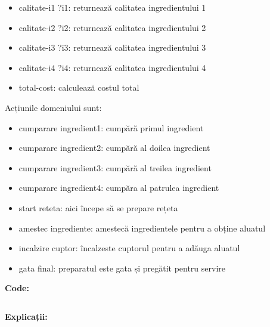  \begin{itemize}
    \setlength\itemsep{0em}
    \item calitate-i1 ?i1: returnează calitatea ingredientului 1
    \item calitate-i2 ?i2: returnează calitatea ingredientului 2
    \item calitate-i3 ?i3: returnează calitatea ingredientului 3
    \item calitate-i4 ?i4: returnează calitatea ingredientului 4
    \item total-cost: calculează costul total


\end{itemize}
Acțiunile domeniului sunt:

 \begin{itemize}
    \setlength\itemsep{0em}
    \item cumparare ingredient1: cumpără primul ingredient
    \item cumparare ingredient2: cumpără al doilea ingredient
    \item cumparare ingredient3: cumpără al treilea ingredient
    \item cumparare ingredient4: cumpăra al patrulea ingredient
    \item start reteta: aici începe să se prepare rețeta
    \item amestec ingrediente:  amestecă ingredientele pentru a obține aluatul
    \item incalzire cuptor: încalzeste cuptorul pentru a adăuga aluatul
    \item  gata final: preparatul este gata și pregătit pentru servire
    
\end{itemize}





\textbf{Code:}

    \inputminted[linenos]{C}{cod/domain_reteta_heuristics.pddl}
\bigskip
\textbf{ Explicații:}

